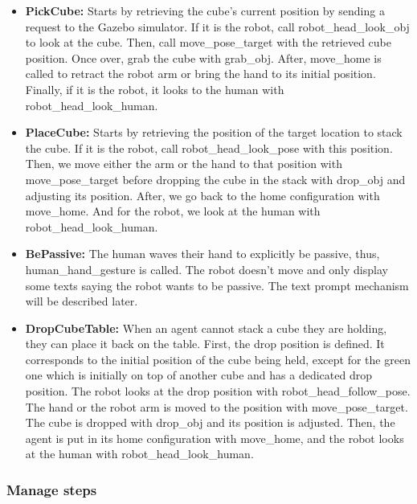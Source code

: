 \begin{itemize}
    \item \textbf{PickCube:}            Starts by retrieving the cube's current position by sending a request to the Gazebo simulator. If it is the robot, call robot\_head\_look\_obj to look at the cube. Then, call move\_pose\_target with the retrieved cube position. Once over, grab the cube with grab\_obj. After, move\_home is called to retract the robot arm or bring the hand to its initial position. Finally, if it is the robot, it looks to the human with robot\_head\_look\_human.
    
    \item \textbf{PlaceCube:}           Starts by retrieving the position of the target location to stack the cube. If it is the robot, call robot\_head\_look\_pose with this position. Then, we move either the arm or the hand to that position with move\_pose\_target before dropping the cube in the stack with drop\_obj and adjusting its position. After, we go back to the home configuration with move\_home. And for the robot, we look at the human with robot\_head\_look\_human. 
    
    \item \textbf{BePassive:}           The human waves their hand to explicitly be passive, thus, human\_hand\_gesture is called. The robot doesn't move and only display some texts saying the robot wants to be passive. The text prompt mechanism will be described later.
    
    \item \textbf{DropCubeTable:}       When an agent cannot stack a cube they are holding, they can place it back on the table. First, the drop position is defined. It corresponds to the initial position of the cube being held, except for the green one which is initially on top of another cube and has a dedicated drop position. The robot looks at the drop position with robot\_head\_follow\_pose. The hand or the robot arm is moved to the position with move\_pose\_target. The cube is dropped with drop\_obj and its position is adjusted. Then, the agent is put in its home configuration with move\_home, and the robot looks at the human with robot\_head\_look\_human.  
\end{itemize}

\subsubsection{Manage steps}

